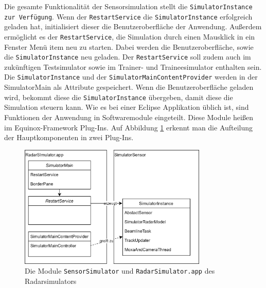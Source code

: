Die gesamte Funktionalität der Sensorsimulation stellt die \texttt{SimulatorInstance zur Verfügung}. Wenn der \texttt{RestartService} die \texttt{SimulatorInstance} erfolgreich geladen hat, initialisiert dieser die Benutzeroberfläche der Anwendung. Außerdem ermöglicht es der \texttt{RestartService}, die Simulation durch einen Mausklick in ein Fenster Menü item neu zu starten. Dabei werden die Benutzeroberfläche, sowie die \texttt{SimulatorInstance} neu geladen. Der \texttt{RestartService} soll zudem auch im zukünftigen Testsimulator sowie im Trainer- und Traineesimulator enthalten sein. Die \texttt{SimulatorInstance} und der \texttt{SimulatorMainContentProvider} werden in der SimulatorMain als Attribute gespeichert. Wenn die Benutzeroberfläche geladen wird, bekommt diese die \texttt{SimulatorInstance} übergeben, damit diese die Simulation steuern kann. Wie es bei einer Eclipse Applikation üblich ist, sind Funktionen der Anwendung in Softwaremodule eingeteilt. Diese Module heißen im Equinox-Framework Plug-Ins. Auf Abbildung \ref{img:SimulatorModels} erkennt man die Aufteilung der Hauptkomponenten in zwei Plug-Ins.

\begin{figure}[h]
    \centering
    \includegraphics[width=0.8\textwidth]{content/assets/Kapitel3/SimulatorModels.png}
    \caption{Die Module \texttt{SensorSimulator} und \texttt{RadarSimulator.app} des Radarsimulators}
    \label{img:SimulatorModels}
\end{figure}




